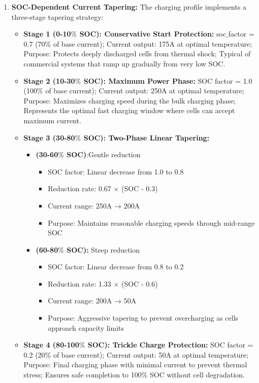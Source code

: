 \documentclass[conference]{IEEEtran}
\begin{document}
\begin{enumerate}
    \item \textbf{SOC-Dependent Current Tapering:} The charging profile implements a three-stage tapering strategy:
    \begin{itemize}
        \item \textbf{Stage 1 (0-10$\%$ SOC): Conservative Start Protection:} 
        soc$\_$factor = 0.7 (70$\%$ of base current);
        Current output: 175A at optimal temperature; 
        Purpose: Protects deeply discharged cells from thermal shock;
        Typical of commercial systems that ramp up gradually from very low SOC.
        \item \textbf {Stage 2 (10-30$\%$ SOC): Maximum Power Phase:} 
        SOC factor = 1.0 (100$\%$ of base current);
        Current output: 250A at optimal temperature;
        Purpose: Maximizes charging speed during the bulk charging phase;
        Represents the optimal fast charging window where cells can accept maximum current.
        \item\textbf{Stage 3 (30-80$\%$ SOC): Two-Phase Linear Tapering:} 
        \begin{itemize}
            \item \textbf{(30-60$\%$ SOC)}:Gentle reduction
            \begin{itemize}
                \item SOC factor: Linear decrease from 1.0 to 0.8
                \item Reduction rate: 0.67 × (SOC - 0.3)
                \item Current range: 250A → 200A
                \item Purpose: Maintains reasonable charging speeds through mid-range SOC
            \end{itemize}
            \item \textbf{(60-80$\%$ SOC):} Steep reduction
            \begin{itemize}
                \item SOC factor: Linear decrease from 0.8 to 0.2
                \item Reduction rate: 1.33 × (SOC - 0.6)
                \item Current range: 200A → 50A
                \item Purpose: Aggressive tapering to prevent overcharging as cells approach capacity limits
            \end{itemize}
            \end{itemize}
    \item\textbf{Stage 4 (80-100$\%$ SOC): Trickle Charge Protection:}
            SOC factor = 0.2 (20$\%$ of base current);
            Current output: 50A at optimal temperature;
            Purpose: Final charging phase with minimal current to prevent thermal stress;
            Ensures safe completion to 100$\%$ SOC without cell degradation.
    \end{itemize}


\end{enumerate}
\end{document}
